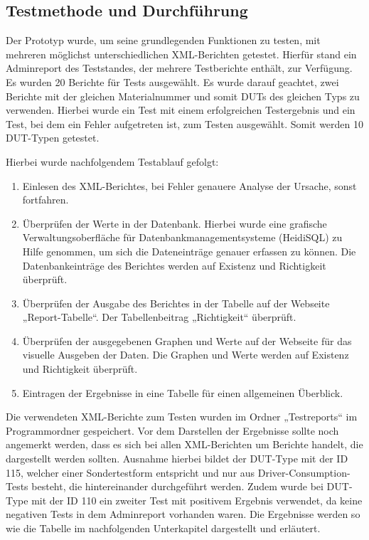 \subsection{Testmethode und Durchführung}
\label{subsec:testmethoden-und-durchfuhrung}

Der Prototyp wurde, um seine grundlegenden Funktionen zu testen, mit mehreren möglichst unterschiedlichen XML-Berichten getestet.
Hierfür stand ein Adminreport des Teststandes, der mehrere Testberichte enthält, zur Verfügung.
Es wurden 20 Berichte für Tests ausgewählt.
Es wurde darauf geachtet, zwei Berichte mit der gleichen Materialnummer und somit \ac{DUTs} des gleichen Typs zu verwenden.
Hierbei wurde ein Test mit einem erfolgreichen Testergebnis und ein Test, bei dem ein Fehler aufgetreten ist, zum Testen ausgewählt.
Somit werden 10 DUT-Typen getestet.

Hierbei wurde nachfolgendem Testablauf gefolgt:

\begin{enumerate}

    \item Einlesen des XML-Berichtes, bei Fehler genauere Analyse der Ursache, sonst fortfahren.
    \item Überprüfen der Werte in der Datenbank. Hierbei wurde eine grafische Verwaltungsoberfläche für
    Datenbankmanagementsysteme (HeidiSQL) zu Hilfe genommen, um sich die Dateneinträge genauer erfassen zu können.
    Die Datenbankeinträge des Berichtes werden auf Existenz und Richtigkeit überprüft.
    \item Überprüfen der Ausgabe des Berichtes in der Tabelle auf der Webseite „Report-Tabelle“.
    Der Tabellenbeitrag „Richtigkeit“ überprüft.
    \item Überprüfen der ausgegebenen Graphen und Werte auf der Webseite für das visuelle Ausgeben der Daten.
    Die Graphen und Werte werden auf Existenz und Richtigkeit überprüft.
    \item Eintragen der Ergebnisse in eine Tabelle für einen allgemeinen Überblick.

\end{enumerate}

Die verwendeten XML-Berichte zum Testen wurden im Ordner „Testreports“ im Programmordner gespeichert.
Vor dem Darstellen der Ergebnisse sollte noch angemerkt werden, dass es sich bei allen XML-Berichten um Berichte handelt, die dargestellt werden sollten.
Ausnahme hierbei bildet der DUT-Type mit der ID 115, welcher einer Sondertestform entspricht und nur aus Driver-Consumption-Tests besteht, die hintereinander durchgeführt werden.
Zudem wurde bei DUT-Type mit der ID 110 ein zweiter Test mit positivem Ergebnis verwendet, da keine negativen Tests in dem Adminreport vorhanden waren.
Die Ergebnisse werden so wie die Tabelle im nachfolgenden Unterkapitel dargestellt und erläutert.






